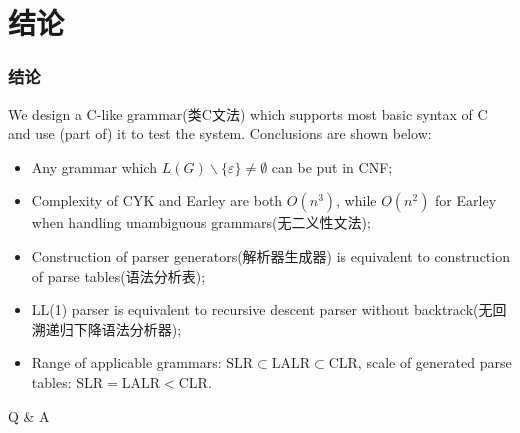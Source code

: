\documentclass{beamer}
\begin{document}
\section{结论}
 \begin{frame}
 \frametitle{结论}
 We design a C-like grammar(类C文法) which supports most basic syntax of C and use (part of) it to test the system. Conclusions are shown below:
\begin{itemize}
\item Any grammar which $L(G)\backslash\{\varepsilon\}\neq \emptyset$ can be put in CNF;
\item Complexity of CYK and Earley are both $O(n^3)$, while $O(n^2)$ for Earley when handling unambiguous grammars(无二义性文法);
\item Construction of parser generators(解析器生成器) is equivalent to construction of parse tables(语法分析表);
\item LL(1) parser is equivalent to recursive descent parser without backtrack(无回溯递归下降语法分析器);
\item Range of applicable grammars: $\mathrm{SLR}\subset\mathrm{LALR}\subset\mathrm{CLR} $, scale of generated parse tables: $\mathrm{SLR}=\mathrm{LALR}<\mathrm{CLR} $.
\end{itemize}
 \end{frame}





\begin{frame}
\Huge{\centerline{Q \& A}}
\end{frame}

\end{document}
